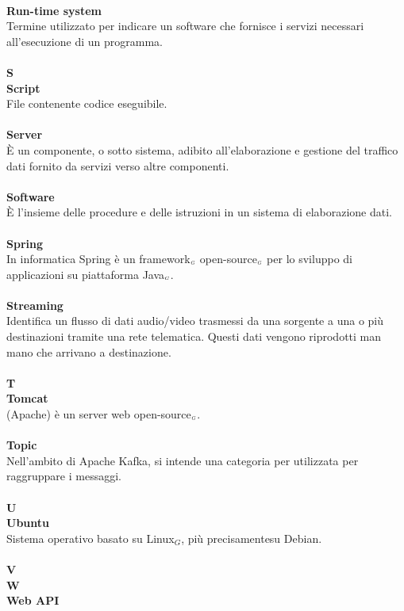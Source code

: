 \\
\textbf{Run-time system}\\
Termine utilizzato per indicare un software che fornisce i servizi necessari all'esecuzione di un programma.\\
\\
\textbf{S}
\\
\textbf{Script}\\
File contenente codice eseguibile.\\
\\
\textbf{Server}\\
È un componente, o sotto sistema, adibito all'elaborazione e gestione del traffico dati fornito da servizi verso altre componenti.\\
\\
\textbf{Software}\\
È l'insieme delle procedure e delle istruzioni in un sistema di elaborazione dati.\\
\\
\textbf{Spring}\\
In informatica Spring è un framework$_{\scaleto{G}{3pt}}$ open-source$_{\scaleto{G}{3pt}}$ per lo sviluppo di applicazioni su piattaforma Java$_{\scaleto{G}{3pt}}$.\\
\\
\textbf{Streaming}\\
Identifica un flusso di dati audio/video trasmessi da una sorgente a una o più destinazioni tramite una rete telematica. Questi dati vengono riprodotti man mano che arrivano a destinazione.\\
\\
\textbf{T}\\
\textbf{Tomcat}\\
(Apache) è un server web open-source$_{\scaleto{G}{3pt}}$.\\
\\
\textbf{Topic}\\
Nell'ambito di Apache Kafka, si intende una categoria per utilizzata per raggruppare i messaggi.\\
\\
\textbf{U}
\\
\textbf{Ubuntu}\\
Sistema operativo basato su Linux$_G$, più precisamentesu Debian.\\
\\
\textbf{V}
\\
\textbf{W}\\
\textbf{Web API}\\
